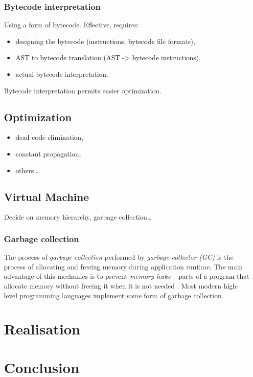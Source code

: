 \documentclass[thesis=M,english]{FITthesis}[2019/12/23]
\begin{document}
\subsection{Bytecode interpretation}
Using a form of bytecode. Effective, requires:
\begin{itemize}
	\item designing the bytecode (instructions, bytecode file formats),
	\item AST to bytecode translation (AST -> bytecode instructions),
	\item actual bytecode interpretation.
\end{itemize}
Bytecode interpretation permits easier optimization.

\section{Optimization}
\begin{itemize}
	\item dead code elimination,
	\item constant propagation,
	\item others\ldots
\end{itemize}

\section{Virtual Machine}
Decide on memory hierarchy, garbage collection\ldots

\subsection{Garbage collection}
The process of \textit{garbage collection} performed by \textit{garbage collector (GC)} is the process of allocating and freeing
memory during application runtime. The main advantage of this mechanics is to prevent \textit{memory leaks} -- parts of a program
that allocate memory without freeing it when it is not needed \cite{memleaks-raygun}. Most modern high-level programming languages
implement some form of garbage collection.



\chapter{Realisation}

\chapter{Conclusion}
\end{document}
